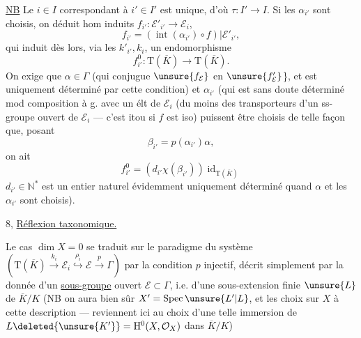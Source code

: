 \uline{NB} Le $i\in I$ correspondant à $i'\in I'$ est unique, d'où $\tau:I'\longrightarrow I$.
Si les $\alpha_{i'}$ sont choisis, on déduit  hom induits
$f_{i'}:\mathcal E'_{i'}\longrightarrow\mathcal E_i$,
\[
f_{i'}=(\operatorname{int}(\alpha_{i'})\circ f)|\mathcal E'_{i'},
\]
qui induit dès lors, via les $k'_{i'},k_i$, un endomorphisme
\[
f^0_{i'}:\mathrm T(\overline K)\longrightarrow\mathrm T(\overline K).
\]
On exige que $\alpha\in\Gamma$ (qui conjugue $\unsure{f_{\mathcal E}}$ en $\unsure{f'_{\mathcal E}}$\}, et est  uniquement déterminé par cette condition) et $\alpha_{i'}$ (qui est sans doute déterminé mod  composition à g. avec un élt  de $\mathcal E_i$ (du moins des transporteurs  d'un ss-groupe ouvert de $\mathcal E_i$ --- c'est itou si $f$ est iso) puissent être choisis de telle façon que, posant
\[
\beta_{i'}=p(\alpha_{i'})\alpha,
\]
on ait
\[
f^0_{i'}=(d_{i'}\chi(\beta_{i'}))\operatorname{id}_{\mathrm T(\overline K)}
\]
$d_{i'}\in\mathbb N^*$ est un entier naturel évidemment uniquement déterminé \unsure{\}} quand $\alpha$ et les $\alpha_{i'}$ sont choisis).


8, \uline{Réflexion taxonomique.}

Le cas $\dim X=0$ se traduit sur le paradigme du système
$(\mathrm T(\overline K)\xrightarrow{k_i}\mathcal E_i\overset{\rho_i}{\hookrightarrow}\mathcal E\xrightarrow{p}\Gamma)$
 par la condition  $p$ injectif, 
décrit 
simplement par la donnée d'un \uline{sous-groupe} ouvert $\mathcal E\subset\Gamma$, i.e. d'une sous-extension finie $\unsure{L}$ de $\overline K/K$
(NB on aura bien sûr $X'=\operatorname{Spec}\unsure{L'|L}$, et les choix  sur $X$   à cette description --- reviennent ici au choix d'une telle immersion de $L\deleted{\unsure{K'}}=\mathrm H^0(X,\mathcal O_X)$ dans $\overline K/K$)

